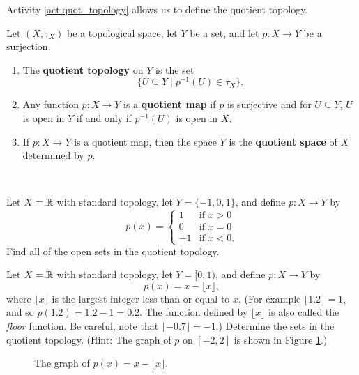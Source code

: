 Activity \ref{act:quot_topology} allows us to define the quotient topology.

\begin{definition} Let $(X,\tau_X)$ be a topological space, let $Y$ be a set, and let $p: X \to Y$ be a surjection. 
\begin{enumerate}
\item The \textbf{quotient topology} on $Y$ is the set
\[\{U \subseteq Y \mid p^{-1}(U) \in \tau_X\}.\]
\item Any function $p: X \to Y$ is a \textbf{quotient map} if $p$ is surjective and for $U \subseteq Y$,  $U$ is open in $Y$ if and only if $p^{-1}(U)$ is open in $X$. 
\item If $p: X \to Y$ is a quotient map, then the space $Y$ is the \textbf{quotient space} of $X$ determined by $p$. 
\end{enumerate}
\end{definition}


\begin{activity} ~
\ba
\item Let $X=\mathbb{R}$ with standard topology, let $Y=\{-1,0,1\}$, and define $p:X \to Y$ by 
\[p(x) = \begin{cases} 1&\text{if } x>0 \\ 0 &\text{if } x=0 \\ -1 &\text{if } x<0. \end{cases}\]
Find all of the open sets in the quotient topology. 

\item Let $X=\mathbb{R}$ with standard topology, let $Y=[0,1)$, and define $p:X \to Y$ by 
\[p(x) = x-\lfloor x\rfloor,\]
where $\lfloor x\rfloor$ is the largest integer less than or equal to $x$, (For example $\lfloor 1.2 \rfloor = 1$, and so $p(1.2) = 1.2 - 1 = 0.2$. The function defined by $\lfloor x\rfloor$ is also called the \emph{floor} function. Be careful, note that $\lfloor -0.7 \rfloor = -1$.)  Determine the sets in the quotient topology.  (Hint: The graph of $p$ on $[-2,2]$ is shown in Figure \ref{F:floor}.)
\begin{figure}[h]
\begin{center}
\caption{The graph of $p(x) = x - \lfloor x\rfloor$.} 
\label{F:floor}
\end{center}
\end{figure}


\ea

\end{activity}

